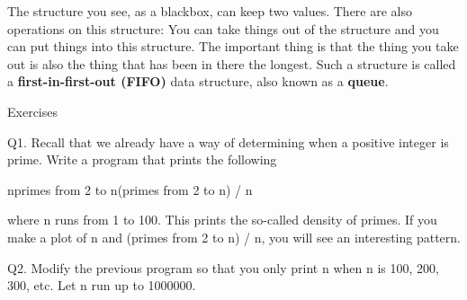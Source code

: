 \documentclass[
]{article}
\begin{document}
The structure you see, as a blackbox, can keep two values. There are
also operations on this structure: You can take things out of the
structure and you can put things into this structure. The important
thing is that the thing you take out is also the thing that has been in
there the longest. Such a structure is called a
\textbf{first-in-first-out (FIFO)} data structure, also known as a
\textbf{queue}.

Exercises

Q1. Recall that we already have a way of determining when a positive
integer is prime. Write a program that prints the following

nprimes from 2 to n(primes from 2 to n) / n

where n runs from 1 to 100. This prints the so-called density of primes.
If you make a plot of n and (primes from 2 to n) / n, you will see an
interesting pattern.

Q2. Modify the previous program so that you only print n when n is 100,
200, 300, etc. Let n run up to 1000000.
\end{document}
